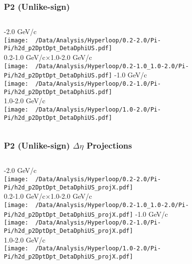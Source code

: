 \documentclass{beamer}
\begin{document}
\begin{frame}
	\frametitle{P2 (Unlike-sign)}
	\begin{columns}
		-2.0 GeV/c\\
		\texttt{[image: ~/Data/Analysis/Hyperloop/0.2-2.0/Pi-Pi/h2d\_p2DptDpt\_DetaDphiUS.pdf]}\\0.2-1.0 GeV/c$\times$1.0-2.0 GeV/c\\
		\texttt{[image: ~/Data/Analysis/Hyperloop/0.2-1.0\_1.0-2.0/Pi-Pi/h2d\_p2DptDpt\_DetaDphiUS.pdf]}
		-1.0 GeV/c\\
		\texttt{[image: ~/Data/Analysis/Hyperloop/0.2-1.0/Pi-Pi/h2d\_p2DptDpt\_DetaDphiUS.pdf]}\\1.0-2.0 GeV/c\\
		\texttt{[image: ~/Data/Analysis/Hyperloop/1.0-2.0/Pi-Pi/h2d\_p2DptDpt\_DetaDphiUS.pdf]}
	\end{columns}
\end{frame}
\begin{frame}
	\frametitle{P2 (Unlike-sign) $\Delta\eta$ Projections}
	\begin{columns}
		\column{0.5\textwidth}
		-2.0 GeV/c\\
		\texttt{[image: ~/Data/Analysis/Hyperloop/0.2-2.0/Pi-Pi/h2d\_p2DptDpt\_DetaDphiUS\_projX.pdf]}\\0.2-1.0 GeV/c$\times$1.0-2.0 GeV/c\\
		\texttt{[image: ~/Data/Analysis/Hyperloop/0.2-1.0\_1.0-2.0/Pi-Pi/h2d\_p2DptDpt\_DetaDphiUS\_projX.pdf]}
		\column{0.5\textwidth}
		-1.0 GeV/c\\
		\texttt{[image: ~/Data/Analysis/Hyperloop/0.2-1.0/Pi-Pi/h2d\_p2DptDpt\_DetaDphiUS\_projX.pdf]}\\1.0-2.0 GeV/c\\
		\texttt{[image: ~/Data/Analysis/Hyperloop/1.0-2.0/Pi-Pi/h2d\_p2DptDpt\_DetaDphiUS\_projX.pdf]}
	\end{columns}
\end{frame}
\end{document}

